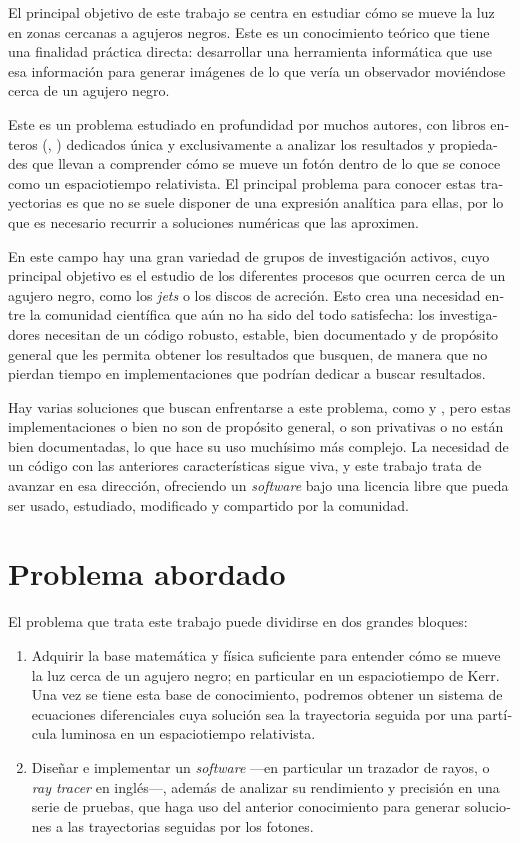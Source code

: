 \begin{otherlanguage}{spanish}
El principal objetivo de este trabajo se centra en estudiar cómo se mueve la luz en zonas cercanas a agujeros negros. Este es un conocimiento teórico que tiene una finalidad práctica directa: desarrollar una herramienta informática que use esa información para generar imágenes de lo que vería un observador moviéndose cerca de un agujero negro.

Este es un problema estudiado en profundidad por muchos autores, con libros enteros (\cite{oneill83}, \cite{oneill95}) dedicados única y exclusivamente a analizar los resultados y propiedades que llevan a comprender cómo se mueve un fotón dentro de lo que se conoce como un espaciotiempo relativista. El principal problema para conocer estas trayectorias es que no se suele disponer de una expresión analítica para ellas, por lo que es necesario recurrir a soluciones numéricas que las aproximen.

En este campo hay una gran variedad de grupos de investigación activos, cuyo principal objetivo es el estudio de los diferentes procesos que ocurren cerca de un agujero negro, como los \emph{jets} o los discos de acreción. Esto crea una necesidad entre la comunidad científica que aún no ha sido del todo satisfecha: los investigadores necesitan de un código robusto, estable, bien documentado y de propósito general que les permita obtener los resultados que busquen, de manera que no pierdan tiempo en implementaciones que podrían dedicar a buscar resultados.

Hay varias soluciones que buscan enfrentarse a este problema, como \cite{thorne15} y \cite{chan13}, pero estas implementaciones o bien no son de propósito general, o son privativas o no están bien documentadas, lo que hace su uso muchísimo más complejo. La necesidad de un código con las anteriores características sigue viva, y este trabajo trata de avanzar en esa dirección, ofreciendo un \emph{software} bajo una licencia libre que pueda ser usado, estudiado, modificado y compartido por la comunidad.

\section*{Problema abordado}

El problema que trata este trabajo puede dividirse en dos grandes bloques:
\begin{enumerate}
	\item Adquirir la base matemática y física suficiente para entender cómo se mueve la luz cerca de un agujero negro; en particular en un espaciotiempo de Kerr. Una vez se tiene esta base de conocimiento, podremos obtener un sistema de ecuaciones diferenciales cuya solución sea la trayectoria seguida por una partícula luminosa en un espaciotiempo relativista.
	\item Diseñar e implementar un \emph{software} ---en particular un trazador de rayos, o \emph{ray tracer} en inglés---, además de analizar su rendimiento y precisión en una serie de pruebas, que haga uso del anterior conocimiento para generar soluciones a las trayectorias seguidas por los fotones. 
\end{enumerate}


\end{otherlanguage}
